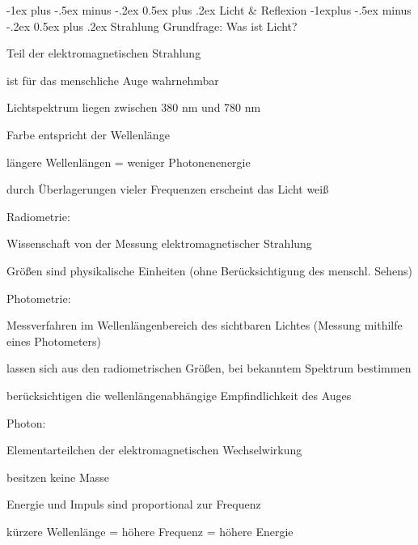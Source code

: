 \documentclass[landscape]{article}
\makeatletter
\renewcommand{\section}{\@startsection{section}{1}{0mm}%
                                {-1ex plus -.5ex minus -.2ex}%
                                {0.5ex plus .2ex}%
                                {\normalfont\large\bfseries}}
\renewcommand{\subsection}{\@startsection{subsection}{2}{0mm}%
                                {-1explus -.5ex minus -.2ex}%
                                {0.5ex plus .2ex}%
                                {\normalfont\normalsize\bfseries}}
\makeatother
\begin{document}
\begin{multicols}{3}
  \section{Licht \& Reflexion}
  \subsection{ Strahlung}
  Grundfrage: Was ist Licht?
  \begin{itemize*}
    \item Teil der elektromagnetischen Strahlung
    \item ist für das menschliche Auge wahrnehmbar
    \item Lichtspektrum liegen zwischen 380 nm und 780 nm
    \item Farbe entspricht der Wellenlänge
    \item längere Wellenlängen = weniger Photonenenergie
    \item durch Überlagerungen vieler Frequenzen erscheint das Licht weiß
  \end{itemize*}
  
  Radiometrie:
  \begin{itemize*}
    \item Wissenschaft von der Messung elektromagnetischer Strahlung
    \item Größen sind physikalische Einheiten (ohne Berücksichtigung des menschl. Sehens)
  \end{itemize*}
  
  Photometrie:
  \begin{itemize*}
    \item Messverfahren im Wellenlängenbereich des sichtbaren Lichtes (Messung mithilfe eines Photometers)
    \item lassen sich aus den radiometrischen Größen, bei bekanntem Spektrum bestimmen
    \item berücksichtigen die wellenlängenabhängige Empfindlichkeit des Auges
  \end{itemize*}
  
  Photon:
  \begin{itemize*}
    \item Elementarteilchen der elektromagnetischen Wechselwirkung
    \item besitzen keine Masse
    \item Energie und Impuls sind proportional zur Frequenz
    \item kürzere Wellenlänge = höhere Frequenz = höhere Energie
  \end{itemize*}
  

\end{multicols}
\end{document}
